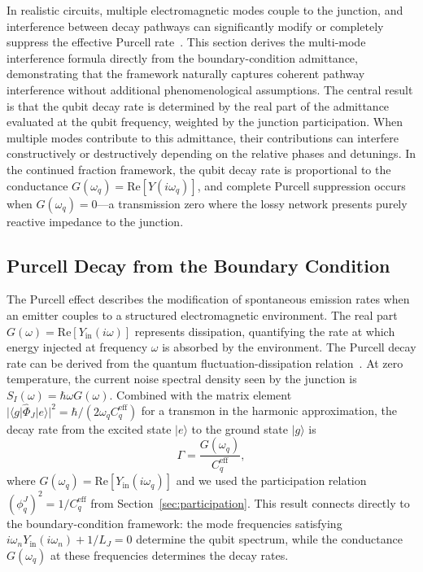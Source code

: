 \documentclass[reprint, floatfix, superscriptaddress, amsmath, amssymb, longbibliography]{revtex4-2}
\newcommand{\Yin}{Y_{\mathrm{in}}}
\begin{document}
In realistic circuits, multiple electromagnetic modes couple to the junction, and interference between decay pathways can significantly modify or completely suppress the effective Purcell rate~\cite{BakrPurcell2025, Bakr2025PRAppl}. This section derives the multi-mode interference formula directly from the boundary-condition admittance, demonstrating that the framework naturally captures coherent pathway interference without additional phenomenological assumptions. The central result is that the qubit decay rate is determined by the real part of the admittance evaluated at the qubit frequency, weighted by the junction participation. When multiple modes contribute to this admittance, their contributions can interfere constructively or destructively depending on the relative phases and detunings. In the continued fraction framework, the qubit decay rate is proportional to the conductance $G(\omega_q) = \mathrm{Re}[Y(i\omega_q)]$, and complete Purcell suppression occurs when $G(\omega_q) = 0$---a transmission zero where the lossy network presents purely reactive impedance to the junction.

\subsection{Purcell Decay from the Boundary Condition}
\label{sec:purcell_bc}

The Purcell effect describes the modification of spontaneous emission rates when an emitter couples to a structured electromagnetic environment. The real part $G(\omega) = \mathrm{Re}[\Yin(i\omega)]$ represents dissipation, quantifying the rate at which energy injected at frequency $\omega$ is absorbed by the environment. The Purcell decay rate can be derived from the quantum fluctuation-dissipation relation~\cite{Clerk2010}. At zero temperature, the current noise spectral density seen by the junction is $S_I(\omega) = \hbar\omega G(\omega)$. Combined with the matrix element $|\langle g | \hat{\Phi}_J | e \rangle|^2 = \hbar/(2\omega_q C_q^{\mathrm{eff}})$ for a transmon in the harmonic approximation, the decay rate from the excited state $|e\rangle$ to the ground state $|g\rangle$ is~\cite{Houck2008}
\begin{equation}
\Gamma = \frac{G(\omega_q)}{C_q^{\mathrm{eff}}},
\label{eq:Gamma_G}
\end{equation}
where $G(\omega_q) = \mathrm{Re}[\Yin(i\omega_q)]$ and we used the participation relation $(\phi_q^J)^2 = 1/C_q^{\mathrm{eff}}$ from Section~\ref{sec:participation}. This result connects directly to the boundary-condition framework: the mode frequencies satisfying $i\omega_n \Yin(i\omega_n) + 1/L_J = 0$ determine the qubit spectrum, while the conductance $G(\omega_q)$ at these frequencies determines the decay rates.
\end{document}
